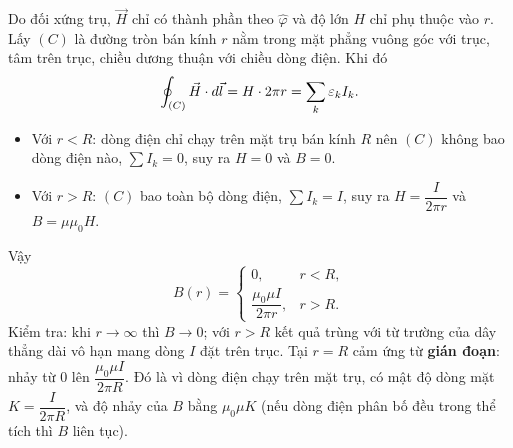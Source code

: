 \begin{sol}
Do đối xứng trụ, $\vec{H}$ chỉ có thành phần theo $\hat{\varphi}$ và độ lớn $H$ chỉ phụ thuộc vào $r$. Lấy $(C)$ là đường tròn bán kính $r$ nằm trong mặt phẳng vuông góc với trục, tâm trên trục, chiều dương thuận với chiều dòng điện. Khi đó
\[
\oint_{(C)} \vec{H}\cdot d\vec{l} = H\cdot 2\pi r = \sum_k \varepsilon_k I_k.
\]
\begin{itemize}
  \item Với $r < R$: dòng điện chỉ chạy trên mặt trụ bán kính $R$ nên $(C)$ không bao dòng điện nào, $\sum I_k = 0$, suy ra $H = 0$ và $B = 0$.
  \item Với $r > R$: $(C)$ bao toàn bộ dòng điện, $\sum I_k = I$, suy ra $H = \dfrac{I}{2\pi r}$ và $B = \mu\mu_0 H$.
\end{itemize}
Vậy
\[
\boxed{B(r) =
\begin{cases}
0, & r < R,\\[6pt]
\dfrac{\mu_0\mu I}{2\pi r}, & r > R.
\end{cases}}
\]
Kiểm tra: khi $r \to \infty$ thì $B \to 0$; với $r > R$ kết quả trùng với từ trường của dây thẳng dài vô hạn mang dòng $I$ đặt trên trục. Tại $r = R$ cảm ứng từ \textbf{gián đoạn}: nhảy từ $0$ lên $\dfrac{\mu_0\mu I}{2\pi R}$. Đó là vì dòng điện chạy trên mặt trụ, có mật độ dòng mặt $K = \dfrac{I}{2\pi R}$, và độ nhảy của $B$ bằng $\mu_0\mu K$ (nếu dòng điện phân bố đều trong thể tích thì $B$ liên tục).
\end{sol}

